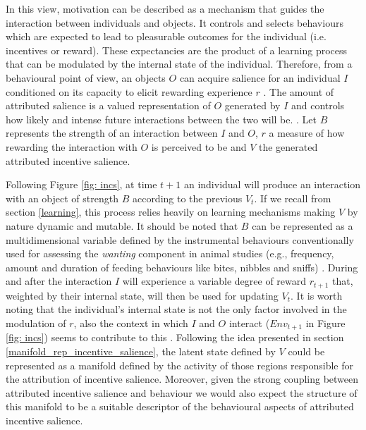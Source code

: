 In this view, motivation can be described as a mechanism that guides the interaction between individuals and objects. It controls and selects behaviours which are expected to lead to pleasurable outcomes for the individual (i.e. incentives or reward). These expectancies are the product of a learning process that can be modulated by the internal state of the individual. Therefore, from a behavioural point of view, an objects $O$ can acquire salience for an individual $I$ conditioned on its capacity to elicit rewarding experience $r$ \cite{berridge1998role,mcclure2003computational}. The amount of attributed salience is a valued representation of $O$ generated by $I$ and controls how likely and intense future interactions between the two will be. \cite{berridge1998role,mcclure2003computational}. Let $B$ represents the strength of an interaction between $I$ and $O$, $r$ a measure of how rewarding the interaction with $O$ is perceived to be and $V$ the generated attributed incentive salience.

Following Figure \ref{fig: incs}, at time $t+1$ an individual will produce an interaction with an object of strength $B$ according to the previous $V_{t}$. If we recall from section \ref{learning}, this process relies heavily on learning mechanisms making $V$ by nature dynamic and mutable. It should be noted that $B$ can be represented as a multidimensional variable defined by the instrumental behaviours conventionally used for assessing the \emph{wanting} component in animal studies (e.g., frequency, amount and duration of feeding behaviours like bites, nibbles and sniffs) \cite{berridge1998role}. During and after the interaction $I$ will experience a variable degree of reward $r_{t+1}$ that, weighted by their internal state, will then be used for updating $V_{t}$.  It is worth noting that the individual's internal state is not the only factor involved in the modulation of $r$, also the context in which $I$ and $O$ interact ($Env_{t+1}$ in Figure \ref{fig: incs}) seems to contribute to this \cite{palminteri2015contextual}. Following the idea presented in section \ref{manifold_rep_incentive_salience}, the latent state defined by $V$ could be represented as a manifold defined by the activity of those regions responsible for the attribution of incentive salience. Moreover, given the strong coupling between attributed incentive salience and behaviour \cite{berridge1998role} we would also expect the structure of this manifold to be a suitable descriptor of the behavioural aspects of attributed incentive salience.

